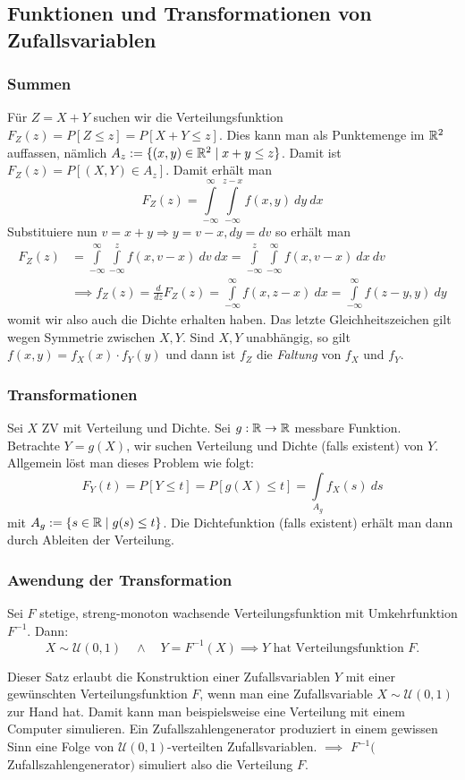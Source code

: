 \subsection{Funktionen und Transformationen von Zufallsvariablen}
\subsubsection*{Summen}
Für $Z=X+Y$ suchen wir die Verteilungsfunktion $F_Z(z) = P[Z \leq z] = P[X+Y \leq z]$. Dies kann man als Punktemenge im $\mathbb{R}^2$ auffassen, nämlich $A_z := \{(x,y) \in \mathbb{R}^2 \;|\; x+y \leq z\}$. Damit ist $F_Z(z) = P[(X,Y) \in A_z]$. Damit erhält man 
$$F_Z(z) = \int \limits_{-\infty}^\infty \int \limits_{-\infty}^{z-x} f(x,y) \ dy \ dx $$
Substituiere nun $v=x+y \Rightarrow y = v-x, dy = dv$ so erhält man
\begin{align*}
	F_Z(z) &= \int \limits_{-\infty}^\infty \int \limits_{-\infty}^z f(x,v-x) \ dv \ dx = \int \limits_{-\infty}^z \int \limits_{-\infty}^\infty f(x,v-x) \ dx \ dv \\&\implies f_Z(z) = \frac{d}{dz}F_Z(z) = \int \limits_{-\infty}^\infty f(x,z-x) \ dx = \int \limits_{-\infty}^\infty f(z-y,y) \ dy
\end{align*}
womit wir also auch die Dichte erhalten haben. Das letzte Gleichheitszeichen gilt wegen Symmetrie zwischen $X,Y$. Sind $X,Y$ unabhängig, so gilt $f(x,y) = f_X(x)\cdot f_Y(y)$ und dann ist $f_Z$ die \textit{Faltung} von $f_X$ und $f_Y$.

\subsubsection*{Transformationen}
Sei $X$ ZV mit Verteilung und Dichte. Sei $g:\mathbb{R}\to\mathbb{R}$ messbare Funktion. Betrachte $Y = g(X)$, wir suchen Verteilung und Dichte (falls existent) von $Y$. Allgemein löst man dieses Problem wie folgt:
$$ F_Y(t) = P[Y \leq t] = P [g(X) \leq t] = \int \limits_{A_g} f_X(s) \ ds $$ mit $A_g := \{ s\in \mathbb{R} \;|\; g(s) \leq t\}$. Die Dichtefunktion (falls existent) erhält man dann durch Ableiten der Verteilung.
\subsubsection*{Awendung der Transformation}
\begin{satz}
Sei $F$ stetige, streng-monoton wachsende Verteilungsfunktion mit Umkehrfunktion $F^{-1}$. Dann:
$$ X \sim \mathcal{U}(0,1) \quad \land \quad Y = F^{-1}(X) \implies Y \mbox{ hat Verteilungsfunktion } F.$$
\end{satz}
Dieser Satz erlaubt die Konstruktion einer Zufallsvariablen $Y$ mit einer gewünschten Verteilungsfunktion $F$, wenn man eine Zufallsvariable $X \sim \mathcal{U}(0,1)$ zur Hand hat. Damit kann man beispielsweise eine Verteilung mit einem Computer simulieren. Ein Zufallszahlengenerator produziert in einem gewissen Sinn eine Folge von $\mathcal{U}(0,1)$-verteilten Zufallsvariablen. $\implies$ $F^{-1}($Zufallszahlengenerator$)$ simuliert also die Verteilung $F$.